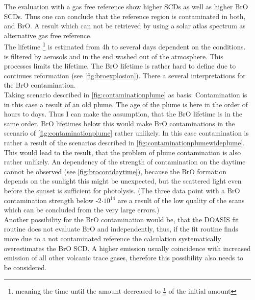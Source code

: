 \documentclass  [
  paper    = a4,
  BCOR     = 10mm,
  twoside,
  fontsize = 12pt,
  fleqn,
  toc      = bibnumbered,
  toc      = listofnumbered,
  numbers  = noendperiod,
  headings = normal,
  listof   = leveldown,
  version  = 3.03
]                                       {scrreprt}
\begin{document}
		The evaluation with a gas free reference show higher  SCDs as well as higher BrO SCDs. Thus one can conclude that the reference region is contaminated in both,  and BrO. A result which can not be retrieved by using a solar atlas spectrum as alternative gas free reference.\\
		The  lifetime \footnote{meaning the time until the amount decreased to $\frac{1}{e}$ of the initial amount} is estimated from 4h to several days dependent on the conditions.  is filtered by aerosols and in the end washed out of the atmosphere. This processes limits the  lifetime.
		The BrO lifetime is rather hard to define due to continues reformation (see \cref{fig:broexplosion}).
		There a several interpretations for the BrO contamination.\\
		Taking scenario described in \cref{fig:contaminationplume} as basis:
		Contamination is in this case a result of an old plume. The age of the plume is here in the order of hours to days. Thus I can make the assumption, that the BrO lifetime is in the same order.
		BrO lifetimes below this would make BrO contaminations in the scenario of \cref{fig:contaminationplume} rather unlikely. In this case contamination is rather a result of the scenarios described in  \cref{fig:contaminationplumewideplume}. This would lead to the result, that the problem of plume contamination is also rather unlikely.
		An dependency of the strength of contamination on the daytime cannot be observed (see \cref{fig:brocontdaytime}), because the BrO formation depends on the sunlight this might be unexpected, but the scattered light even before the sunset is sufficient for  photolysis. (The three data point with a BrO contamination strength below -2$\cdot 10^{14}$ are a result of the low quality of the scans which can be concluded from the very large errors.)\\
		Another possibility for the BrO contamination would be, that the DOASIS fit routine does not evaluate BrO and  independently, thus, if the fit routine finds more  due to a not contaminated reference the calculation systematically overestimates the BrO SCD. A higher  emission usually coincidence with increased emission of all other volcanic trace gases, therefore this possibility also needs to be considered.


%	
\end{document}
